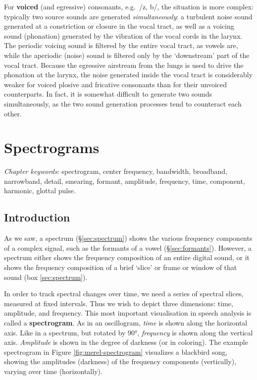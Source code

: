 \documentclass[
]{book}
\begin{document}
For \textbf{voiced} (and egressive) consonants, e.g.~/z, b/, the situation is more complex: typically two source sounds are generated \emph{simultaneously}: a turbulent noise sound generated at a constriction or closure in the vocal tract, as well as a voicing sound (phonation) generated by the vibration of the vocal cords in the larynx. The periodic voicing sound is filtered by the entire vocal tract, as vowels are, while the aperiodic (noise) sound is filtered only by the `downstream' part of the vocal tract.
Because the egressive airstream from the lungs is used to drive the phonation at the larynx, the noise generated inside the vocal tract is considerably weaker for voiced plosive and fricative consonants than for their unvoiced counterparts. In fact, it is somewhat difficult to generate two sounds simultaneously, as the two sound generation processes tend to counteract each other.

\chapter{Spectrograms}\label{ch-spectrograms}

\emph{Chapter keywords}: spectrogram, center frequency, bandwidth, broadband, narrowband, detail, smearing, formant, amplitude, frequency, time, component, harmonic, glottal pulse.

\section{Introduction}\label{sec:spectrogram-intro}

As we saw, a spectrum (§\ref{sec:spectrum}) shows the various frequency components of a complex signal, such as the formants of a vowel (§\ref{sec:formants}). However, a spectrum either shows the frequency composition of an entire digital sound, or it shows the frequency composition of a brief `slice' or frame or window of that sound (box \ref{sec:spectrum}).

In order to track spectral changes over time, we need a series of spectral slices, measured at fixed intervals. Thus we wish to depict three dimensions: time, amplitude, and frequency. This most important visualisation in speech analysis is called a \textbf{spectrogram}. As in an oscillogram, \emph{time} is shown along the horizontal axis. Like in a spectrum, but rotated by 90°, \emph{frequency} is shown along the vertical axis. \emph{Amplitude} is shown in the degree of darkness (or in coloring).
The example spectrogram in Figure \ref{fig:merel-spectrogram} visualizes a blackbird song, showing the amplitudes (darkness) of the frequency components (vertically), varying over time (horizontally).
\end{document}
